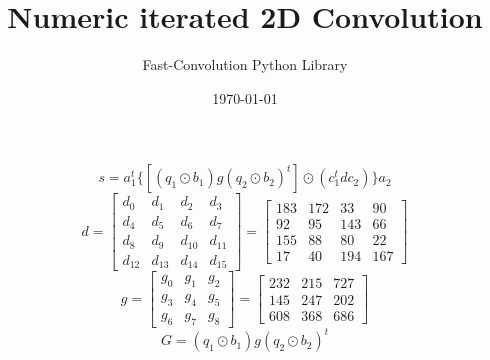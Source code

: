 \documentclass{article}%
\title{Numeric iterated 2D Convolution}%
\author{Fast{-}Convolution Python Library}%
\date{\today}%
\begin{document}
%
\normalsize%
\maketitle%
\[%
s=a_1^t \{[(q_1 \odot b_1) g (q_2 \odot b_2)^t] \odot (c_1^t d c_2)\}a_2%
\]%
\[%
d = \left[\begin{matrix}d_{0} & d_{1} & d_{2} & d_{3}\\d_{4} & d_{5} & d_{6} & d_{7}\\d_{8} & d_{9} & d_{10} & d_{11}\\d_{12} & d_{13} & d_{14} & d_{15}\end{matrix}\right] = \left[\begin{matrix}183 & 172 & 33 & 90\\92 & 95 & 143 & 66\\155 & 88 & 80 & 22\\17 & 40 & 194 & 167\end{matrix}\right]%
\]%
\[%
g = \left[\begin{matrix}g_{0} & g_{1} & g_{2}\\g_{3} & g_{4} & g_{5}\\g_{6} & g_{7} & g_{8}\end{matrix}\right] = \left[\begin{matrix}232 & 215 & 727\\145 & 247 & 202\\608 & 368 & 686\end{matrix}\right]%
\]%
\[%
G = (q_1 \odot b_1) g (q_2 \odot b_2)^t%
\]%
\end{document}
